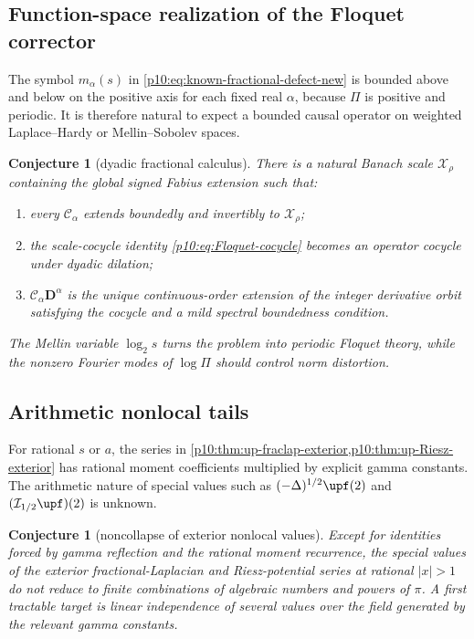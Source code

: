 \documentclass[11pt,oneside]{article}
\newtheorem{conjecture}[theorem]{Conjecture}
\theoremstyle{definition}
\theoremstyle{remark}
\newcommand{\1}{\mathbf 1}
\begin{document}
\subsection{Function-space realization of the Floquet corrector}

The symbol \(m_\alpha(s)\) in \eqref{p10:eq:known-fractional-defect-new} is bounded above
and below on the positive axis for each fixed real \(\alpha\), because \(\Pi\) is
positive and periodic.  It is therefore natural to expect a bounded causal operator on
weighted Laplace--Hardy or Mellin--Sobolev spaces.

\begin{conjecture}[dyadic fractional calculus]\label{p10:conj:Floquet-space}
There is a natural Banach scale \(\mathcal X_\rho\) containing the global signed Fabius
extension such that:
\begin{enumerate}
\item every \(\mathcal C_\alpha\) extends boundedly and invertibly to
\(\mathcal X_\rho\);
\item the scale-cocycle identity \eqref{p10:eq:Floquet-cocycle} becomes an operator cocycle
under dyadic dilation;
\item \(\mathcal C_\alpha\mathbf D^\alpha\) is the unique continuous-order extension of
the integer derivative orbit satisfying the cocycle and a mild spectral boundedness
condition.
\end{enumerate}
The Mellin variable \(\log_2s\) turns the problem into periodic Floquet theory, while
the nonzero Fourier modes of \(\log\Pi\) should control norm distortion.
\end{conjecture}

\subsection{Arithmetic nonlocal tails}

For rational \(s\) or \(a\), the series in
\cref{p10:thm:up-fraclap-exterior,p10:thm:up-Riesz-exterior} has rational moment coefficients
multiplied by explicit gamma constants.  The arithmetic nature of special values such
as
\(
 (-\Delta)^{1/2}\upf(2)
\)
and \((\mathcal I_{1/2}\upf)(2)\) is unknown.

\begin{conjecture}[noncollapse of exterior nonlocal values]
\label{p10:conj:nonlocal-arithmetic}
Except for identities forced by gamma reflection and the rational moment recurrence,
the special values of the exterior fractional-Laplacian and Riesz-potential series at
rational \(|x|>1\) do not reduce to finite combinations of algebraic numbers and powers
of \(\pi\).  A first tractable target is linear independence of several values over the
field generated by the relevant gamma constants.
\end{conjecture}
\end{document}
